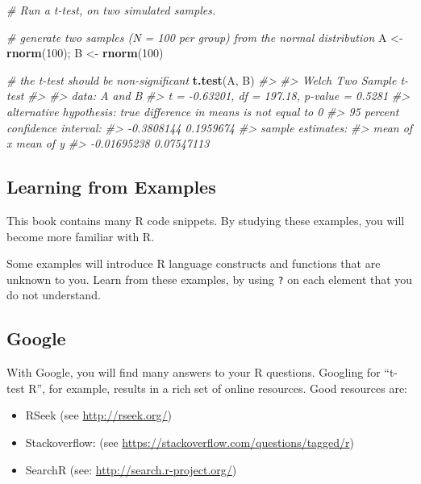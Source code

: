 \documentclass[]{book}
\newenvironment{Shaded}{\begin{snugshade}}{\end{snugshade}}
\newcommand{\KeywordTok}[1]{\textcolor[rgb]{0.13,0.29,0.53}{\textbf{#1}}}
\newcommand{\DecValTok}[1]{\textcolor[rgb]{0.00,0.00,0.81}{#1}}
\newcommand{\StringTok}[1]{\textcolor[rgb]{0.31,0.60,0.02}{#1}}
\newcommand{\CommentTok}[1]{\textcolor[rgb]{0.56,0.35,0.01}{\textit{#1}}}
\newcommand{\NormalTok}[1]{#1}
\begin{document}
\begin{Shaded}
\begin{Highlighting}[]
\CommentTok{# Run a t-test, on two simulated samples.}

\CommentTok{# generate two samples (N = 100 per group) from the normal distribution}
\NormalTok{A <-}\StringTok{ }\KeywordTok{rnorm}\NormalTok{(}\DecValTok{100}\NormalTok{); B <-}\StringTok{ }\KeywordTok{rnorm}\NormalTok{(}\DecValTok{100}\NormalTok{)}

\CommentTok{# the t-test should be non-significant }
\KeywordTok{t.test}\NormalTok{(A, B)}
\CommentTok{#> }
\CommentTok{#>  Welch Two Sample t-test}
\CommentTok{#> }
\CommentTok{#> data:  A and B}
\CommentTok{#> t = -0.63201, df = 197.18, p-value = 0.5281}
\CommentTok{#> alternative hypothesis: true difference in means is not equal to 0}
\CommentTok{#> 95 percent confidence interval:}
\CommentTok{#>  -0.3808144  0.1959674}
\CommentTok{#> sample estimates:}
\CommentTok{#>   mean of x   mean of y }
\CommentTok{#> -0.01695238  0.07547113}
\end{Highlighting}
\end{Shaded}

\subsection{Learning from Examples}\label{learning-from-examples}

This book contains many R code snippets. By studying these examples, you
will become more familiar with R.

Some examples will introduce R language constructs and functions that
are unknown to you. Learn from these examples, by using \texttt{?} on
each element that you do not understand.

\subsection{Google}\label{google}

With Google, you will find many answers to your R questions. Googling
for ``t-test R'', for example, results in a rich set of online
resources. Good resources are:

\begin{itemize}
\item
  RSeek (see \url{http://rseek.org/})
\item
  Stackoverflow: (see
  \url{https://stackoverflow.com/questions/tagged/r})
\item
  SearchR (see: \url{http://search.r-project.org/})
\end{itemize}
\end{document}
